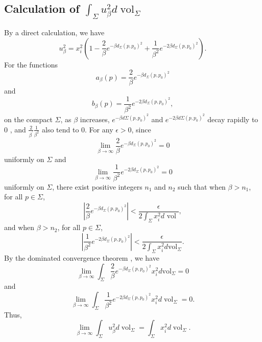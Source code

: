 \documentclass[a4, 12pt]{amsart}
\numberwithin{equation}{section} \numberwithin{equation}{section}
\begin{document}
\subsection{Calculation of $\int_{\Sigma} u_{\beta}^{2} d \operatorname{vol}_{\Sigma}$}
By a direct calculation, we have
\begin{equation*}
u_{\beta}^{2}=x_{i}^{2}\left(1-\frac{2}{\beta} e^{-\beta d_{\Sigma}\left(p, p_{0}\right)^{2}}+\frac{1}{\beta^{2}} e^{-2 \beta d_{\Sigma}\left(p, p_{0}\right)^{2}}\right).
\end{equation*}
For the functions
\begin{equation*}a_{\beta}(p)=\frac{2}{\beta} e^{-\beta d_{\Sigma}\left(p, p_{0}\right)^{2}}\end{equation*} and
\begin{equation*}b_{\beta}(p)=\frac{1}{\beta^{2}} e^{-2 \beta d_{\Sigma}\left(p, p_{0}\right)^{2}},\end{equation*} on the compact $\Sigma$, as $\beta$ increases, $e^{-\beta d \Sigma\left(p, p_{0}\right)^{2}}$ and $e^{-2 \beta d \Sigma\left(p, p_{0}\right)^{2}}$ decay rapidly to 0 , and $\frac{2}{\beta^{\prime}} \frac{1}{\beta^{2}}$ also tend to $0$.
For any $\epsilon>0$, since
\begin{equation*}\lim _{\beta \rightarrow \infty} \frac{2}{\beta} e^{-\beta d_{\Sigma}\left(p, p_{0}\right)^{2}}=0\end{equation*} uniformly on $\Sigma$ and
\begin{equation*}\lim _{\beta \rightarrow \infty} \frac{1}{\beta^{2}} e^{-2 \beta d_{\Sigma}\left(p, p_{0}\right)^{2}}=0\end{equation*} uniformly on $\Sigma$, there exist positive integers $n_{1}$ and $n_{2}$ such that when $\beta>n_{1}$, for all $p \in \Sigma$,
\begin{equation*}\left|\frac{2}{\beta} e^{-\beta d _{\Sigma}\left(p, p_{0}\right)^{2}}\right|<\frac{\epsilon}{2 \int_{\Sigma} x_{i}^{2} d \text { vol }},\end{equation*} and when $\beta>n_{2}$, for all $p \in \Sigma$,
\begin{equation*}\left|\frac{1}{\beta^{2}} e^{-2 \beta d _{\Sigma}(p, p_{0})^{2}}\right|<\frac{\epsilon}{2 \int_{\Sigma} x_{i}^{2} d \mathrm{vol}_{\Sigma}}.\end{equation*}
By the dominated convergence theorem \cite{Eva}, we have
\begin{equation*}\lim _{\beta \rightarrow \infty} \int_{\Sigma} \frac{2}{\beta} e^{-\beta d_{\Sigma}\left(p, p_{0}\right)^{2}} x_{i}^{2} d \mathrm{vol}{ }_{\Sigma}=0\end{equation*} and
\begin{equation*}\lim _{\beta \rightarrow \infty} \int_{\Sigma} \frac{1}{\beta^{2}} e^{-2 \beta d _{\Sigma}(p, p _{0})^{2}} x_{i}^{2} d \operatorname{vol}_{\Sigma}=0.\end{equation*}
Thus,
\begin{equation*}\lim _{\beta \rightarrow \infty} \int_{\Sigma} u_{\beta}^{2} d \operatorname{vol}_{\Sigma}=\int_{\Sigma} x_{i}^{2} d \operatorname{vol}_{\Sigma}.\end{equation*}
\end{document}
